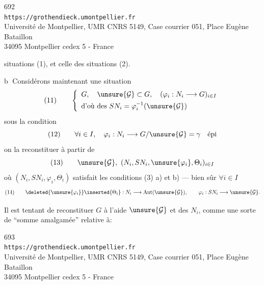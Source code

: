 
\begin{center}
692\\
\texttt{https://grothendieck.umontpellier.fr}\\
Université de Montpellier, UMR CNRS 5149, Case courrier 051, Place Eugène Bataillon\\
34095 Montpellier cedex 5 - France
\end{center}



situations (1), et celle des situations (2).

\textcircled{b}
Considérons maintenant une situation
\[
(11)\qquad 
\left\{\begin{array}{l}
G,\quad \unsure{\mathcal G}\subset G,\quad (\varphi_i:N_i\longrightarrow G)_{i\in I}\\[4pt]
\text{d'où des }SN_i=\varphi_i^{-1}(\unsure{\mathcal G})
\end{array}\right.
\]
sous la condition
\[
(12)\qquad 
\forall i\in I,\quad \varphi_i:N_i\longrightarrow G/\unsure{\mathcal G}=\gamma\quad\text{épi}
\]
 on la reconstituer à partir de
\[
(13)\qquad 
\unsure{\mathcal G},\ (N_i,SN_i,\unsure{\varphi_i},\Theta_i)_{i\in I}
\]
où  $(N_i,SN_i,\varphi_i,\Theta_i)$ satisfait les conditions (3) a) et b) ---  bien sûr $\forall i\in I$
\[
(14)\qquad 
\deleted{\unsure{\varphi_i}}\inserted{\Theta_i}:N_i\longrightarrow\operatorname{Aut}(\unsure{\mathcal G}),\qquad
\varphi_i:SN_i\longrightarrow\unsure{\mathcal G}.
\]

Il est tentant de reconstituer $G$ à l'aide  $\unsure{\mathcal G}$ et des $N_i$, comme une sorte de ``somme amalgamée'' relative à:

\noindent {}\quad
{}


\begin{center}
693\\
\texttt{https://grothendieck.umontpellier.fr}\\
Université de Montpellier, UMR CNRS 5149, Case courrier 051, Place Eugène Bataillon\\
34095 Montpellier cedex 5 - France
\end{center}


